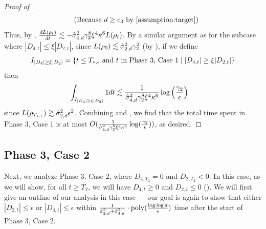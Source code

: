 \begin{proof}[Proof of ]
\begin{align}
& \tag{Because $d \geq c_3$ by \Cref{assumption:target}}
\end{align}
Thus, by , $\frac{dL(\rho_t)}{dt} \lesssim - \hat{\sigma}_{4, d}^2 \gamma_2^8 \xi^4 \kappa^6 L(\rho_t)$. By a similar argument as for the subcase where $|D_{4, t}| \leq \xi |D_{2, t}|$, since $L(\rho_0) \lesssim \hat{\sigma}_{2, d}^2 \gamma_2^2$ (by ), if we define 
\begin{align}
I_{|D_4| \geq \xi |D_2|} = \{t \leq T_{*, \epsilon} \text{ and }t \text{ in Phase 3, Case 1} \mid |D_{4, t}| \geq \xi |D_{2, t}|\}
\end{align}
then
\begin{align} \label{eq:phase3_case1_timebound_B}
\int_{I_{|D_4| \geq \xi |D_2|}} 1 dt 
& \lesssim \frac{1}{\hat{\sigma}_{4, d}^2 \gamma_2^8 \xi^4 \kappa^6} \log\Big(\frac{\gamma_2}{\epsilon}\Big)
\end{align}
since $L(\rho_{T_{*, \epsilon}}) \gtrsim \hat{\sigma}_{2, d}^2 \epsilon^2$. Combining  and , we find that the total time spent in Phase 3, Case 1 is at most $O(\frac{1}{\hat{\sigma}_{4, d}^2 \gamma_2^8 \xi^4 \kappa^6} \log(\frac{\gamma_2}{\epsilon}))$, as desired.
\end{proof}

\subsection{Phase 3, Case 2} \label{subsec:phase3_case2}

Next, we analyze Phase 3, Case 2, where $D_{4, T_2} = 0$ and $D_{2, T_2} < 0$. In this case, as we will show, for all $t \geq T_2$, we will have $D_{4, t} \geq 0$ and $D_{2, t} \leq 0$ (). We will first give an outline of our analysis in this case --- our goal is again to show that either $|D_{2, t}| \leq \epsilon$ or $|D_{4, t}| \leq \epsilon$ within $\frac{1}{\hat{\sigma}_{2, d}^2 + \hat{\sigma}_{4, d}^2} \cdot \textup{poly}(\frac{\log \log d}{\epsilon})$ time after the start of Phase 3, Case 2.


